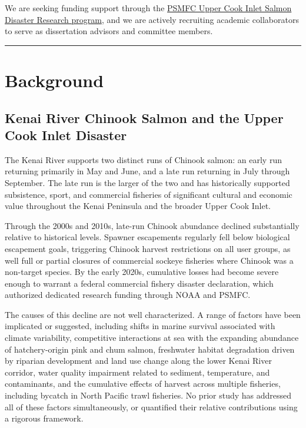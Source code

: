 \documentclass[
  letterpaper,
  DIV=11,
  numbers=noendperiod]{scrreprt}
\begin{document}
We are seeking funding support through the
\href{https://www.psmfc.org/procurement/upper-cook-inlet-salmon-disaster-research/}{PSMFC
Upper Cook Inlet Salmon Disaster Research program}, and we are actively
recruiting academic collaborators to serve as dissertation advisors and
committee members.

\begin{center}\rule{0.5\linewidth}{0.5pt}\end{center}

\section{Background}\label{background}

\subsection{Kenai River Chinook Salmon and the Upper Cook Inlet
Disaster}\label{kenai-river-chinook-salmon-and-the-upper-cook-inlet-disaster}

The Kenai River supports two distinct runs of Chinook salmon: an early
run returning primarily in May and June, and a late run returning in
July through September. The late run is the larger of the two and has
historically supported subsistence, sport, and commercial fisheries of
significant cultural and economic value throughout the Kenai Peninsula
and the broader Upper Cook Inlet.

Through the 2000s and 2010s, late-run Chinook abundance declined
substantially relative to historical levels. Spawner escapements
regularly fell below biological escapement goals, triggering Chinook
harvest restrictions on all user groups, as well full or partial
closures of commercial sockeye fisheries where Chinook was a non-target
species. By the early 2020s, cumulative losses had become severe enough
to warrant a federal commercial fishery disaster declaration, which
authorized dedicated research funding through NOAA and PSMFC.

The causes of this decline are not well characterized. A range of
factors have been implicated or suggested, including shifts in marine
survival associated with climate variability, competitive interactions
at sea with the expanding abundance of hatchery-origin pink and chum
salmon, freshwater habitat degradation driven by riparian development
and land use change along the lower Kenai River corridor, water quality
impairment related to sediment, temperature, and contaminants, and the
cumulative effects of harvest across multiple fisheries, including
bycatch in North Pacific trawl fisheries. No prior study has addressed
all of these factors simultaneously, or quantified their relative
contributions using a rigorous framework.
\end{document}

